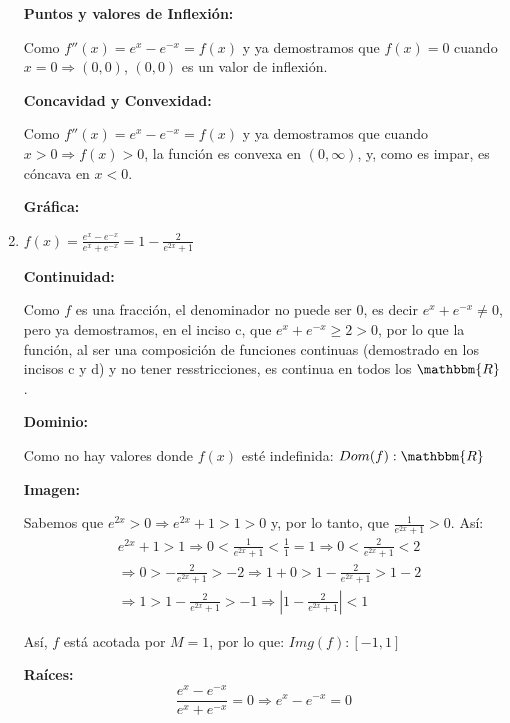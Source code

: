 \documentclass[12pt]{article}
\begin{document}
\begin{enumerate}[\hspace{9px} a)]
        \textbf{Puntos y valores de Inflexi\'on: }\medskip

            Como \(f''(x)=e^x-e^{-x}=f(x)\) y ya demostramos que \(f(x)=0\) cuando \(x=0 \Rightarrow (0,0)\), \((0,0)\) es un valor de inflexi\'on.

        \textbf{Concavidad y Convexidad: }\medskip

            Como \(f''(x)=e^x-e^{-x}=f(x)\) y ya demostramos que cuando \(x>0 \Rightarrow f(x)>0\), la funci\'on es convexa en \((0,\infty)\), y, como es impar, es c\'oncava en \(x<0\).\medskip

        \textbf{Gr\'afica: }

    \item \(f(x)=\displaystyle\frac{e^x-e^{-x}}{e^x+e^{-x}}=1-\frac{2}{e^{2x}+1}\)\medskip
    
        \textbf{Continuidad: }\medskip

            Como \(f\) es una fracci\'on, el denominador no puede ser 0, es decir \(e^x+e^{-x}\neq0\), pero ya demostramos, en el inciso c, que \(e^x+e^{-x}\geq2>0\), por lo que la funci\'on, al ser una composici\'on de funciones continuas (demostrado en los incisos c y d) y no tener resstricciones, es continua en todos los \(\mathbbm{R}\).\medskip

        \textbf{Dominio: }\medskip

            Como no hay valores donde $f(x)$ est\'e indefinida: \(Dom(f):\mathbbm{R}\)\medskip

        \textbf{Imagen: }\medskip

            Sabemos que \(e^{2x}>0 \Rightarrow e^{2x}+1>1>0\) y, por lo tanto, que \(\displaystyle\frac{1}{e^{2x}+1}>0\). As\'i:
            \begin{align*}
                &e^{2x}+1>1 \Longrightarrow 0<\frac{1}{e^{2x}+1}<\frac{1}{1}=1 \Longrightarrow  0<\frac{2}{e^{2x}+1}<2 \\
                &\Longrightarrow  0>-\frac{2}{e^{2x}+1}>-2 \Longrightarrow  1+0>1-\frac{2}{e^{2x}+1}>1-2 \\ 
                &\Longrightarrow  1>1-\frac{2}{e^{2x}+1}>-1 \Longrightarrow \left|1-\frac{2}{e^{2x}+1}\right|<1
            \end{align*}

            As\'i, $f$  est\'a acotada por $M=1$, por lo que: \(Img(f): [-1,1]\)\medskip

        \textbf{Ra\'ices: }
            \begin{equation*}
                \frac{e^x-e^{-x}}{e^x+e^{-x}}=0 \Longrightarrow e^x-e^{-x}=0
            \end{equation*}


\end{enumerate}
\end{document}
